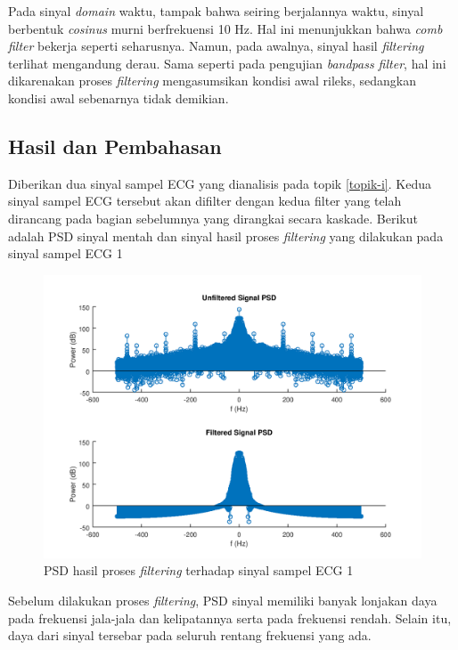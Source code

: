 \documentclass[11pt]{article}
\begin{document}
Pada sinyal \textit{domain} waktu, tampak bahwa seiring berjalannya waktu, sinyal berbentuk \textit{cosinus} murni berfrekuensi 10 Hz. Hal ini menunjukkan bahwa \textit{comb filter} bekerja seperti seharusnya. Namun, pada awalnya, sinyal hasil \textit{filtering} terlihat mengandung derau. Sama seperti pada pengujian \textit{bandpass filter}, hal ini dikarenakan proses \textit{filtering} mengasumsikan kondisi awal rileks, sedangkan kondisi awal sebenarnya tidak demikian.

\subsection{Hasil dan Pembahasan}

Diberikan dua sinyal sampel ECG yang dianalisis pada topik \ref{topik-i}. Kedua sinyal sampel ECG tersebut akan difilter dengan kedua filter yang telah dirancang pada bagian sebelumnya yang dirangkai secara kaskade. Berikut adalah PSD sinyal mentah dan sinyal hasil proses \textit{filtering} yang dilakukan pada sinyal sampel ECG 1

\begin{figure}[H]
\centerline{\includegraphics[scale=0.55]{figures/fig22-ecg1filteredpsd.png}}
\caption{PSD hasil proses \textit{filtering} terhadap sinyal sampel ECG 1}
\label{ecg1filteredpsd}
\end{figure}

Sebelum dilakukan proses \textit{filtering}, PSD sinyal memiliki banyak lonjakan daya pada frekuensi jala-jala dan kelipatannya serta pada frekuensi rendah. Selain itu, daya dari sinyal tersebar pada seluruh rentang frekuensi yang ada. 
\end{document}
